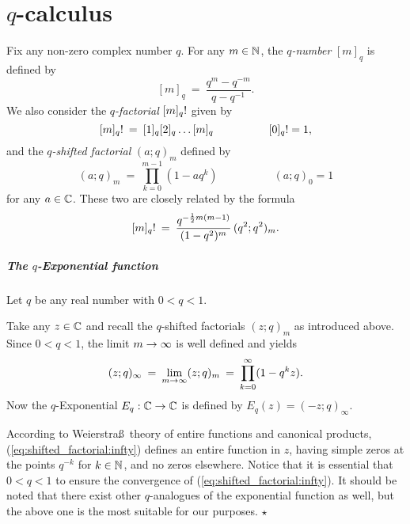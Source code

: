 

\chapter{$q$-calculus} \label{app:qcalc}


Fix any non-zero complex number $q$. For any $m \in \mathbb{N}$, the {\em $q$-number\/}
$[m]_q$ is defined by
$$  [m]_q  \:=\:  \frac{q^m - q^{-m}}{q - q^{-1}}.  $$
We also consider the {\em $q$-factorial\/} $[m]_q!$ given by
$$  [m]_q!  \:=\:  [1]_q [2]_q \ldots [m]_q     \hspace{5em} [0]_q! = 1, $$
and the {\em $q$-shifted factorial\/} $(a;q)_m$ defined by
$$ (a;q)_m    \:=\:  \prod_{k=0}^{m-1} (1-a q^k)  \hspace{5em} (a;q)_0 =1  $$
for any $a\in \mathbb{C}$. These two are closely related by the formula \cite{Schmudgen}
$$ [m]_q!   \:=\: \frac{q^{-\frac{1}{2}m(m-1)}}{(1-q^2)^m} \, (q^2;q^2)_m. $$



\paragraph{The $q$-Exponential function}
Let $q$ be any real number with $0<q<1$.

\begin{defn_chp} \label{def:shifted_factorial:qExp}
Take any $z\in \mathbb{C}$ and recall the $q$-shifted factorials $(z;q)_m$ as introduced above.
Since $0<q<1$, the limit $m\rightarrow \infty$ is well defined and yields
\begin{equation}\label{eq:shifted_factorial:infty}
(z;q)_\infty  \:=\: \lim_{m\rightarrow \infty} (z;q)_m
              \:=\: \prod_{k=0}^{\infty} (1-q^k z).
\end{equation}
Now the $q$-Exponential $E_q : \mathbb{C} \rightarrow \mathbb{C}$ is defined by $E_q(z)=(-z;q)_\infty$.
\end{defn_chp}


\begin{remark_chp} \rm
According to Weierstra\ss\ theory of entire functions and canonical products,
(\ref{eq:shifted_factorial:infty}) defines an entire function in $z$,
having simple zeros at the points $q^{-k}$ for $k\in \mathbb{N}$, and no zeros
elsewhere. Notice that it is essential that $0<q<1$ to ensure the convergence
of (\ref{eq:shifted_factorial:infty}).
It should be noted that there exist other $q$-analogues of the
exponential function as well, but the above one is the most suitable for our purposes.
\hfill $\star$
\end{remark_chp}


